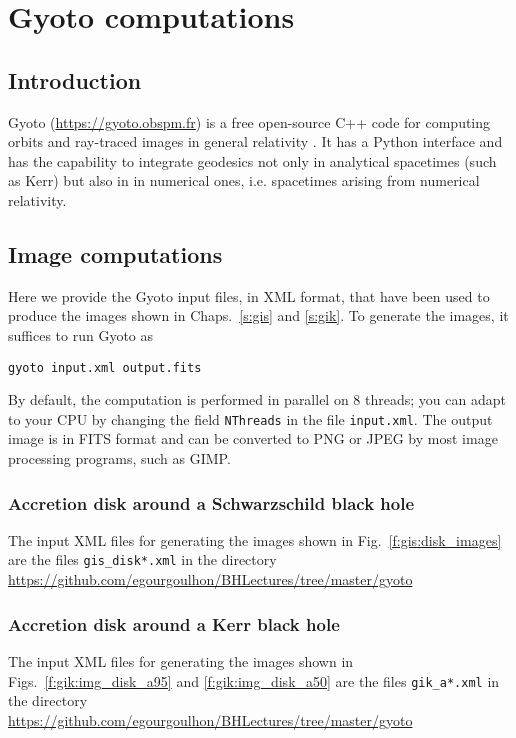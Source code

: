 \chapter{Gyoto computations} \label{s:gyo}

\minitoc

\section{Introduction}


\textsf{Gyoto} (\url{https://gyoto.obspm.fr}) is a free open-source
C++ code for computing orbits and ray-traced images in general relativity
\cite{VincePGP11}.
It has a Python interface and has the capability to integrate geodesics
not only in analytical spacetimes (such as Kerr) but also in
in numerical ones, i.e. spacetimes arising from numerical relativity.


\section{Image computations}

Here we provide the \textsf{Gyoto} input files, in XML format, that have been
used to produce the images shown in Chaps.~\ref{s:gis} and \ref{s:gik}.
To generate the images, it suffices to run \textsf{Gyoto} as
\begin{center}
\verb+gyoto input.xml output.fits+
\end{center}
By default, the computation is performed in parallel on 8 threads; you can
adapt to your CPU by changing the field \texttt{NThreads} in the file
\texttt{input.xml}. The output image is in FITS format and can be converted
to PNG or JPEG by most image processing programs, such as \textsf{GIMP}.

\subsection{Accretion disk around a Schwarzschild black hole} \label{s:gyo:Schwarz}

The input XML files for generating the images shown in Fig.~\ref{f:gis:disk_images}
are the files \verb+gis_disk*.xml+ in the directory\\
\url{https://github.com/egourgoulhon/BHLectures/tree/master/gyoto}


\subsection{Accretion disk around a Kerr black hole} \label{s:gyo:Kerr}

The input XML files for generating the images shown in Figs.~\ref{f:gik:img_disk_a95}
and \ref{f:gik:img_disk_a50}
are the files \verb+gik_a*.xml+ in the directory\\
\url{https://github.com/egourgoulhon/BHLectures/tree/master/gyoto}

